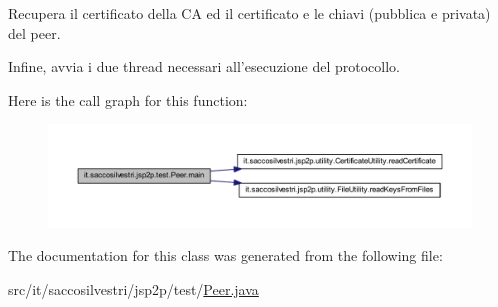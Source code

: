 \-Recupera il certificato della \-C\-A ed il certificato e le chiavi (pubblica e privata) del peer. 

\-Infine, avvia i due thread necessari all'esecuzione del protocollo. 

\-Here is the call graph for this function\-:
\nopagebreak
\begin{figure}[H]
\begin{center}
\leavevmode
\includegraphics[width=350pt]{classit_1_1saccosilvestri_1_1jsp2p_1_1test_1_1_peer_a5c84d0215254ede0666e83d6345643c1_cgraph}
\end{center}
\end{figure}




\-The documentation for this class was generated from the following file\-:\begin{DoxyCompactItemize}
\item 
src/it/saccosilvestri/jsp2p/test/\hyperlink{_peer_8java}{\-Peer.\-java}\end{DoxyCompactItemize}
